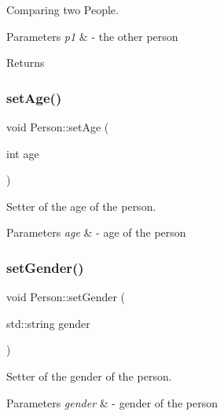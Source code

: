 Comparing two People. 


\begin{DoxyParams}{Parameters}
{\em p1} & -\/ the other person \\
\hline
\end{DoxyParams}
\begin{DoxyReturn}{Returns}

\end{DoxyReturn}
\mbox{\label{class_person_ac8ade54c27a0657c987c395ff04a9d46}} 
\subsubsection{\texorpdfstring{set\+Age()}{setAge()}}
{\footnotesize\ttfamily void Person\+::set\+Age (\begin{DoxyParamCaption}\item[{int}]{age }\end{DoxyParamCaption})}



Setter of the age of the person. 


\begin{DoxyParams}{Parameters}
{\em age} & -\/ age of the person \\
\hline
\end{DoxyParams}
\mbox{\label{class_person_a7625b600d2c9c0b9c9fc060a6906dac6}} 
\subsubsection{\texorpdfstring{set\+Gender()}{setGender()}}
{\footnotesize\ttfamily void Person\+::set\+Gender (\begin{DoxyParamCaption}\item[{std\+::string}]{gender }\end{DoxyParamCaption})}



Setter of the gender of the person. 


\begin{DoxyParams}{Parameters}
{\em gender} & -\/ gender of the person \\
\hline
\end{DoxyParams}
\mbox{\label{class_person_ad6e438f456d3ae6f5b477931c0a6aeba}} 

